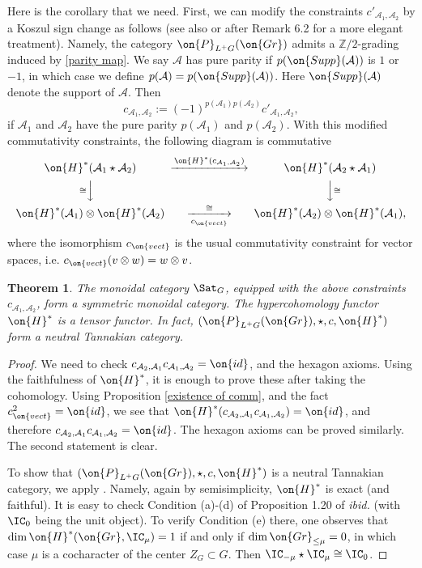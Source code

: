 \documentclass[]{pcmi}
\theoremstyle{plain}
\newtheorem{thm}[equation]{Theorem}
\theoremstyle{remark}
\theoremstyle{definition}
\newcommand{\bZ}{{\mathbb Z}}
\newcommand{\mA}{{\mathcal A}}
\newcommand{\Gr}{{\on{Gr}}}
\newcommand{\id}{{\on{id}}}
\begin{document}
Here is the corollary that we need.
First, we can modify the constraints $c'_{\mA_1,\mA_2}$  by a Koszul sign change as follows (see also \cite[\S~5.3.21]{BD} or \cite{MV} after Remark 6.2 for a more elegant treatment). Namely, the category $\on{P}_{L^+G}(\Gr)$ admits a $\bZ/2$-grading induced by \eqref{parity map}. We say $\mA$ has pure parity if $p(\on{Supp}(\mA))$ is $1$ or $-1$, in which case we define $p(\mA)=p(\on{Supp}(\mA))$. 
Here $\on{Supp}(\mA)$ denote the support of $\mA$. Then
\begin{equation}\label{koszul sign change}
c_{\mA_1,\mA_2}:=(-1)^{p(\mA_1)p(\mA_2)}c'_{\mA_1,\mA_2},
\end{equation}
if $\mA_1$ and $\mA_2$ have the pure parity $p(\mA_1)$ and $p(\mA_2)$. With this modified commutativity constraints, the following diagram is commutative
\[\begin{CD}
\on{H}^*(\mA_1\star\mA_2)@>\on{H}^*(c_{\mA_1,\mA_2})>>\on{H}^*(\mA_2\star\mA_1)\\
@V\cong VV@VV\cong V\\
\on{H}^*(\mA_1)\otimes\on{H}^*(\mA_2)@>\cong>c_{\on{vect}}>\on{H}^*(\mA_2)\otimes\on{H}^*(\mA_1),
\end{CD}\]
where the isomorphism $c_{\on{vect}}$ is the usual commutativity constraint for vector spaces, i.e. 
$c_{\on{vect}}(v\otimes w)=w\otimes v$.

\begin{thm}\label{Tannakian structure}
The monoidal category $\Sat_G$, equipped with the above constraints $c_{\mA_1,\mA_2}$, form a symmetric monoidal category. The hypercohomology functor $\on{H}^*$ is a tensor functor.  In fact, $(\on{P}_{L^+G}(\Gr),\star,c,\on{H}^*)$ form a neutral Tannakian category. 
\end{thm} 
\begin{proof}We need to check $c_{\mA_2,\mA_1}c_{\mA_1,\mA_2}=\id$, and the hexagon axioms.
Using the faithfulness of $\on{H}^*$, it is enough to prove these after taking the cohomology. Using Proposition \ref{existence of comm}, and the fact $c_{\on{vect}}^2=\id$, we see that $\on{H}^*(c_{\mA_2,\mA_1}c_{\mA_1,\mA_2})=\id$, and therefore $c_{\mA_2,\mA_1}c_{\mA_1,\mA_2}=\id$. The hexagon axioms can be proved similarly.
The second statement is clear.

To show that $(\on{P}_{L^+G}(\Gr),\star,c,\on{H}^*)$ is a neutral Tannakian category, we apply \cite[Proposition 1.20, Remark 2.18]{DM}. Namely, again by semisimplicity, $\on{H}^*$ is exact (and faithful). It is easy to check Condition (a)-(d) of Proposition 1.20 of \emph{ibid.} (with $\IC_0$ being the unit object). To verify Condition (e) there, one observes that $\dim \on{H}^*(\Gr,\IC_\mu)=1$ if and only if $\dim \Gr_{\leq \mu}=0$, in which case $\mu$ is a cocharacter of the center $Z_G\subset G$. Then $\IC_{-\mu}\star\IC_\mu\cong \IC_0$.
\end{proof}
\end{document}
